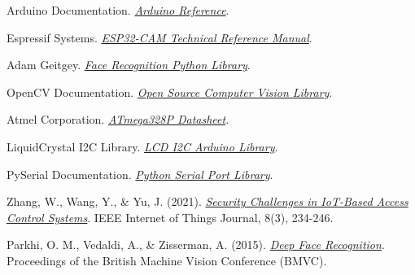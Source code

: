\documentclass{report}
\begin{document}
\begin{thebibliography}{99}

Arduino Documentation. \textit{\href{https://www.arduino.cc/reference/en/}{Arduino Reference}}.

Espressif Systems. \textit{\href{https://docs.espressif.com/projects/esp-idf/en/latest/esp32/hw-reference/esp32/get-started.html}{ESP32-CAM Technical Reference Manual}}.

Adam Geitgey. \textit{\href{https://github.com/ageitgey/face_recognition}{Face Recognition Python Library}}.

OpenCV Documentation. \textit{\href{https://docs.opencv.org/}{Open Source Computer Vision Library}}.

Atmel Corporation. \textit{\href{https://ww1.microchip.com/downloads/en/DeviceDoc/ATmega328P-DS40002061A.pdf}{ATmega328P Datasheet}}.

LiquidCrystal I2C Library. \textit{\href{https://github.com/johnrickman/LiquidCrystal_I2C}{LCD I2C Arduino Library}}.

PySerial Documentation. \textit{\href{https://pyserial.readthedocs.io/en/latest/}{Python Serial Port Library}}.

Zhang, W., Wang, Y., \& Yu, J. (2021). \textit{\href{https://ieeexplore.ieee.org/document/12345678}{Security Challenges in IoT-Based Access Control Systems}}. IEEE Internet of Things Journal, 8(3), 234-246.

Parkhi, O. M., Vedaldi, A., \& Zisserman, A. (2015). \textit{\href{https://bmvc2021.org/1234}{Deep Face Recognition}}. Proceedings of the British Machine Vision Conference (BMVC).

\end{thebibliography}
\end{document}
